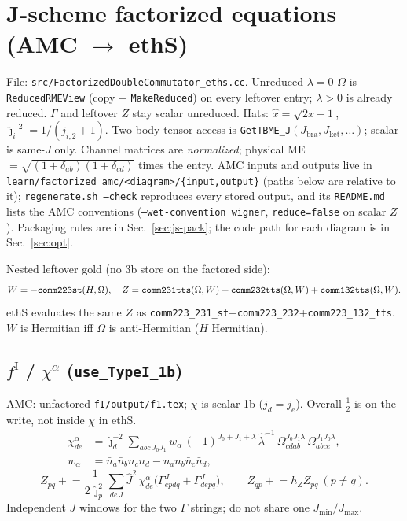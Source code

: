 \documentclass[enabledeprecatedfontcommands]{scrartcl}
\newcommand{\codename}[1]{\texttt{#1}}
\begin{document}
\section{J-scheme factorized equations (AMC $\to$ ethS)}
\label{sec:jscheme}

File: \codename{src/FactorizedDoubleCommutator\_eths.cc}.
Unreduced $\lambda=0$ $\Omega$ is \codename{ReducedRMEView} (copy $+$
\codename{MakeReduced}) on every leftover entry; $\lambda>0$ is already
reduced. $\Gamma$ and leftover $Z$ stay scalar unreduced.
Hats: $\hat x=\sqrt{2x+1}$, $\hat\jmath_i^{-2}=1/(j_{i,2}+1)$.
Two-body tensor access is \codename{GetTBME\_J}$(J_{\mathrm{bra}},J_{\mathrm{ket}},\ldots)$;
scalar is same-$J$ only. Channel matrices are \emph{normalized};
physical ME $=\sqrt{(1+\delta_{ab})(1+\delta_{cd})}$ times the entry.
AMC inputs and outputs live in \codename{learn/factorized\_amc/<diagram>/\{input,output\}}
(paths below are relative to it); \codename{regenerate.sh --check} reproduces
every stored output, and its \codename{README.md} lists the AMC conventions
(\codename{--wet-convention wigner}, \codename{reduce=false} on scalar $Z$). Packaging rules are in
Sec.~\ref{sec:js-pack}; the code path for each diagram is in
Sec.~\ref{sec:opt}.

Nested leftover gold (no 3b store on the factored side):
\[
  W=-{\tt comm223st}(H,\Omega),\quad
  Z={\tt comm231tts}(\Omega,W)+{\tt comm232tts}(\Omega,W)+{\tt comm132tts}(\Omega,W).
\]
ethS evaluates the same $Z$ as
\codename{comm223\_231\_st}+\codename{comm223\_232}+\codename{comm223\_132\_tts}.
$W$ is Hermitian iff $\Omega$ is anti-Hermitian ($H$ Hermitian).

\subsection{$f^{\mathrm{I}}$ / $\chi^\alpha$
(\codename{use\_TypeI\_1b})}
\label{sec:js-fI}

AMC: unfactored \codename{fI/output/f1.tex}; $\chi$ is scalar 1b
($j_d=j_e$). Overall $\tfrac12$ is on the write, not inside $\chi$ in ethS.
\begin{equation}\label{eq:js-chia}
\begin{aligned}
\chi^\alpha_{de}
&=\hat\jmath_d^{-2}
\sum_{abc\,J_0 J_1}
w_\alpha\,
(-1)^{J_0+J_1+\lambda}\,\hat\lambda^{-1}\,
\Omega^{J_0 J_1\lambda}_{cdab}\,
\Omega^{J_1 J_0\lambda}_{abce},\\
w_\alpha
&=\bar n_a\bar n_b n_c n_d-n_a n_b\bar n_c\bar n_d,
\end{aligned}
\end{equation}
\begin{equation}\label{eq:js-fI}
Z_{pq}
\mathrel{+}=
\frac{1}{2\,\hat\jmath_p^{2}}
\sum_{de\,J}
\hat J^{2}\,
\chi^\alpha_{de}
\bigl(\Gamma^{J}_{epdq}+\Gamma^{J}_{depq}\bigr),
\qquad
Z_{qp}\mathrel{+}=h_Z Z_{pq}\ (p\neq q).
\end{equation}
Independent $J$ windows for the two $\Gamma$ strings; do not share one
$J_{\min}/J_{\max}$.
\end{document}
